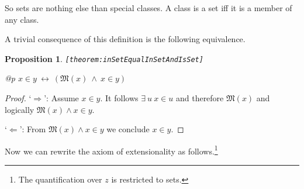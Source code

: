 \documentclass[a4paper,german,10pt,twoside]{book}
\newtheorem{prop}[thm]{Proposition}
\theoremstyle{definition}
\theoremstyle{remark}
\begin{document}
So sets are nothing else than special classes. A class is a set iff it is a member of any class.


\par
A trivial consequence of this definition is the following equivalence.

\begin{prop}
\label{theorem:inSetEqualInSetAndIsSet} \hypertarget{theorem:inSetEqualInSetAndIsSet}{}
{\tt \tiny [\verb]theorem:inSetEqualInSetAndIsSet]]}
\mbox{}
\begin{longtable}{{@{\extracolsep{\fill}}p{\linewidth}}}
\centering $x \in y\ \leftrightarrow\ (\mathfrak{M}(x)\ \land\ x \in y)$
\end{longtable}

\end{prop}
\begin{proof}
`$\Rightarrow$': Assume $x \in y$. It follows $\exists \ u \ x \in u$ and therefore $\mathfrak{M}(x)$ and logically $\mathfrak{M}(x) \land x \in y$.

\par
`$\Leftarrow$': From $\mathfrak{M}(x) \land x \in y$ we conclude $x \in y$.
\end{proof}


\par
Now we can rewrite the axiom of extensionality as follows.\footnote{The quantification over $z$ is restricted to sets.}
\end{document}
